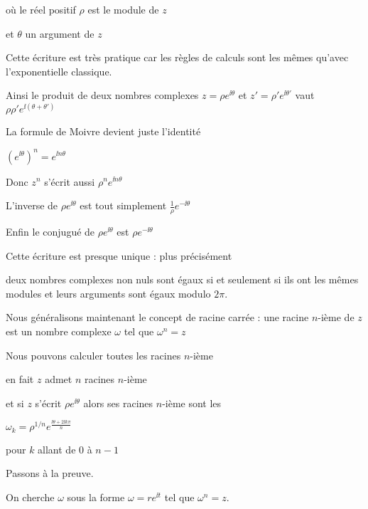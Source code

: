 où le réel positif $\rho$ est le module de $z$

et $\theta$ un argument de $z$

Cette écriture est très pratique car les règles de calculs sont les mêmes
qu'avec l'exponentielle classique.

\change

Ainsi le produit de deux nombres complexes 
$z = \rho e^{\ii  \theta}$  et  $z' = \rho' e^{\ii  \theta'}$
vaut $\rho \rho' e^{\ii  (\theta + \theta')}$

\change

La formule de Moivre devient juste l'identité

$\left(e^{\ii\theta}\right)^n = e^{\ii n \theta}$

\change

Donc $z^n$ s'écrit aussi $\rho^n e^{\ii n \theta}$

\change

L'inverse de $\rho e^{\ii  \theta}$
est tout simplement $\frac{1}{\rho} e^{- \ii \theta}$

\change

Enfin le conjugué de $\rho e^{\ii  \theta}$ est $\rho e^{-\ii \theta}$


\change

Cette écriture est presque unique : plus précisément 

deux nombres complexes non nuls sont égaux si et seulement si
ils ont les mêmes modules
et leurs arguments sont égaux modulo $2\pi$.




\diapo


Nous généralisons maintenant le concept de racine carrée : une racine $n$-ième
de $z$ est un nombre complexe $\omega$ tel que 
$\omega^n=z$

\change
Nous pouvons calculer toutes les racines $n$-ième


en fait $z$ admet $n$ racines $n$-ième 

et si $z$ s'écrit $\rho e^{\ii \theta}$ alors ses racines $n$-ième sont les

$\omega_k = \rho^{1/n} e^{\frac{\ii\theta + 2\ii k\pi}{n}}$

pour $k$ allant de $0$ à $n-1$


\change

Passons à la preuve.

On cherche $\omega$ sous la forme $\omega=re^{\ii t}$ tel que $\omega^n=z$.

